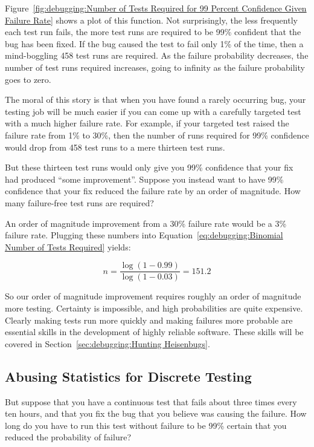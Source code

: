 Figure~\ref{fig:debugging:Number of Tests Required for 99 Percent Confidence Given Failure Rate}
shows a plot of this function.
Not surprisingly, the less frequently each test run fails, the more
test runs are required to be 99\% confident that the bug has been
fixed.
If the bug caused the test to fail only 1\% of the time, then a
mind-boggling 458 test runs are required.
As the failure probability decreases, the number of test runs required
increases, going to infinity as the failure probability goes to zero.

The moral of this story is that when you have found a rarely occurring
bug, your testing job will be much easier if you can come up with
a carefully targeted test with a much higher failure rate.
For example, if your targeted test raised the failure rate from 1\%
to 30\%, then the number of runs required for 99\% confidence
would drop from 458 test runs to a mere thirteen test runs.

But these thirteen test runs would only give you 99\% confidence that
your fix had produced ``some improvement''.
Suppose you instead want to have 99\% confidence that your fix reduced
the failure rate by an order of magnitude.
How many failure-free test runs are required?

An order of magnitude improvement from a 30\% failure rate would be
a 3\% failure rate.
Plugging these numbers into
Equation~\ref{eq:debugging:Binomial Number of Tests Required} yields:

\begin{equation}
	n = \frac{\log\left(1 - 0.99\right)}{\log\left(1 - 0.03\right)} = 151.2
\end{equation}

So our order of magnitude improvement requires roughly an order of
magnitude more testing.
Certainty is impossible, and high probabilities are quite expensive.
Clearly making tests run more quickly and making failures more probable
are essential skills in the development of highly reliable software.
These skills will be covered in
Section~\ref{sec:debugging:Hunting Heisenbugs}.

\subsection{Abusing Statistics for Discrete Testing}
\label{sec:debugging:Abusing Statistics for Discrete Testing}

But suppose that you have a continuous test that fails about three
times every ten hours, and that you fix the bug that you believe was
causing the failure.
How long do you have to run this test without failure to be 99\% certain
that you reduced the probability of failure?

